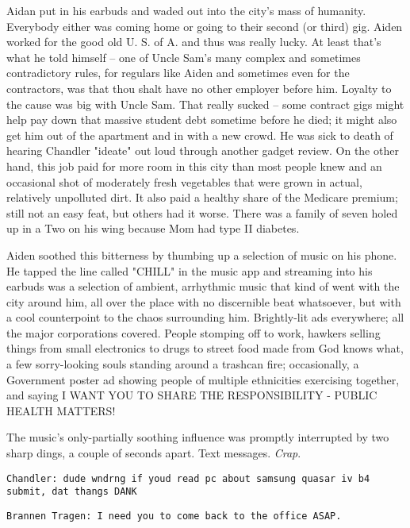 \documentclass[11pt]{book}
\begin{document}
	Aidan put in his earbuds and waded out into the city's mass of humanity. Everybody either was coming home or going to their second (or third) gig. Aiden worked for the good old U. S. of A. and thus was really lucky. At least that’s what he told himself -- one of Uncle Sam’s many complex and sometimes contradictory rules, for regulars like Aiden and sometimes even for the contractors, was that thou shalt have no other employer before him. Loyalty to the cause was big with Uncle Sam. That really sucked -- some contract gigs might help pay down that massive student debt sometime before he died; it might also get him out of the apartment and in with a new crowd. He was sick to death of hearing Chandler "ideate" out loud through another gadget review. On the other hand, this job paid for more room in this city than most people knew and an occasional shot of moderately fresh vegetables that were grown in actual, relatively unpolluted dirt. It also paid a healthy share of the Medicare premium; still not an easy feat, but others had it worse. There was a family of seven holed up in a Two on his wing because Mom had type II diabetes.
	
	Aiden soothed this bitterness by thumbing up a selection of music on his phone. He tapped the line called "CHILL" in the music app and streaming into his earbuds was a selection of ambient, arrhythmic music that kind of went with the city around him, all over the place with no discernible beat whatsoever, but with a cool counterpoint to the chaos surrounding him. Brightly-lit ads everywhere; all the major corporations covered. People stomping off to work, hawkers selling things from small electronics to drugs to street food made from God knows what, a few sorry-looking souls standing around a trashcan fire; occasionally, a Government poster ad showing people of multiple ethnicities exercising together, and saying I WANT YOU TO SHARE THE RESPONSIBILITY - PUBLIC HEALTH MATTERS! 
	
	The music's only-partially soothing influence was promptly interrupted by two sharp dings, a couple of seconds apart. Text messages. \textit{Crap}.
	
	\vspace{0.5cm}
	
	\texttt{Chandler: dude wndrng if youd read pc about samsung quasar iv b4 submit, dat thangs DANK} 
	
	\texttt{Brannen Tragen: I need you to come back to the office ASAP.}
	
	\vspace{0.5cm}
	
\end{document}
